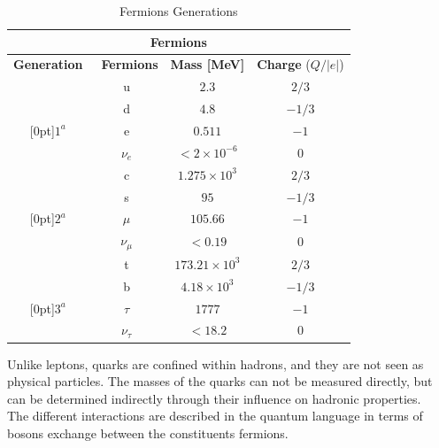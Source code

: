 \begin{table}[h]
\footnotesize
\begin{center}
\begin{tabular}{|c|c|c|c|}\hline\hline
\multicolumn{4}{|c|}{\bfseries Fermions}\\ \hline\hline
  \textbf{Generation} & \ \textbf{Fermions} &  \textbf{Mass [MeV]}  &  \textbf{Charge} ($Q/\left|e\right|$) \\ \hline
  &u & $2.3$ & $2/3$   \\ \cline{2-4}
  & d & $4.8$ & $-1/3$ \\\cline{2-4} 
\raisebox{1.5ex}[0pt]{$1^{a}$}   &e & $0.511$ & $-1$   \\ \cline{2-4}
  & $\nu_{e}$ & $ < 2 \times 10^{-6}$ & $0$  \\ \hline
 &c & $1.275\times 10^{3}$ & $2/3$ \\ \cline{2-4} 
  &s & $95$ & $-1/3$ \\ \cline{2-4}
\raisebox{1.5ex}[0pt]{$2^{a}$} &$\mu$ & $105.66$ & $-1$ \\ \cline{2-4}
  & $\nu_{\mu}$ & $<  0.19$ & $0$ \\ \hline
&t & $173.21\times 10^{3}$ & $2/3$ \\ \cline{2-4}  
  &b & $4.18\times 10^{3}$ & $-1/3$ \\ \cline{2-4}
\raisebox{1.5ex}[0pt]{$3^{a}$} &$\tau$ & $1777$ & $-1$ \\ \cline{2-4}
 & $\nu_{\tau}$ & $< 18.2$ & $0$  \\ \hline\hline
\end{tabular}
\caption{Fermions Generations}\label{tab3} 
\end{center}
\end{table}

Unlike leptons, quarks are confined within hadrons, and they are not seen as physical particles. The masses of the quarks can not be measured directly, but can be determined indirectly through their influence on hadronic properties.\\
\indent
The different interactions are described in the quantum language in terms of bosons exchange between the constituents fermions.

